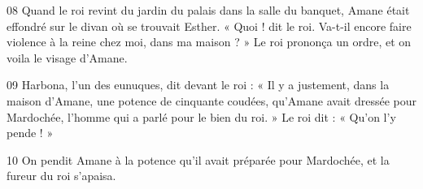 
08 Quand le roi revint du jardin du palais dans la salle du banquet, Amane était effondré sur le divan où se trouvait Esther. « Quoi ! dit le roi. Va-t-il encore faire violence à la reine chez moi, dans ma maison ? » Le roi prononça un ordre, et on voila le visage d’Amane.

09 Harbona, l’un des eunuques, dit devant le roi : « Il y a justement, dans la maison d’Amane, une potence de cinquante coudées, qu’Amane avait dressée pour Mardochée, l’homme qui a parlé pour le bien du roi. » Le roi dit : « Qu’on l’y pende ! »

10 On pendit Amane à la potence qu’il avait préparée pour Mardochée, et la fureur du roi s’apaisa.